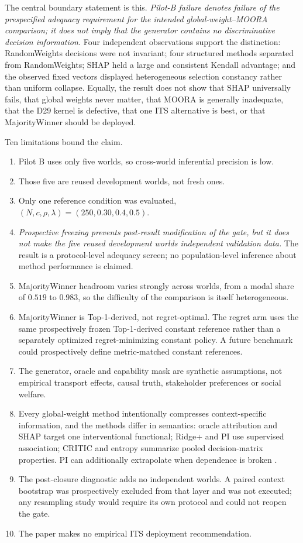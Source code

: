 \documentclass[runningheads,orivec]{llncs}
\newcommand{\MOORA}{MOORA}
\newcommand{\CRITIC}{CRITIC}
\begin{document}
The central boundary statement is this. \emph{Pilot-B failure denotes failure of the
prespecified adequacy requirement for the intended global-weight--\MOORA{} comparison;
it does not imply that the generator contains no discriminative decision information.}
Four independent observations support the distinction: RandomWeights decisions were not
invariant; four structured methods separated from RandomWeights; SHAP held a large and
consistent Kendall advantage; and the observed fixed vectors displayed heterogeneous
selection constancy rather than uniform collapse. Equally, the result does not show
that SHAP universally fails, that global weights never matter, that \MOORA{} is
generally inadequate, that the D29 kernel is defective, that one ITS alternative is
best, or that MajorityWinner should be deployed.

Ten limitations bound the claim.

\begin{enumerate}
\itemsep1pt
\item Pilot B uses only five worlds, so cross-world inferential precision is low.
\item Those five are reused development worlds, not fresh ones.
\item Only one reference condition was evaluated, $(N,c,\rho,\lambda)=(250,0.30,0.4,0.5)$.
\item \emph{Prospective freezing prevents post-result modification of the gate, but it
does not make the five reused development worlds independent validation data.} The
result is a protocol-level adequacy screen; no population-level inference about method
performance is claimed.
\item MajorityWinner headroom varies strongly across worlds, from a modal share of
$0.519$ to $0.983$, so the difficulty of the comparison is itself heterogeneous.
\item MajorityWinner is Top-1-derived, not regret-optimal. The regret arm uses the same
prospectively frozen Top-1-derived constant reference rather than a separately
optimized regret-minimizing constant policy. A future benchmark could prospectively
define metric-matched constant references.
\item The generator, oracle and capability mask are synthetic assumptions, not
empirical transport effects, causal truth, stakeholder preferences or social welfare.
\item Every global-weight method intentionally compresses context-specific information,
and the methods differ in semantics: oracle attribution and SHAP target one
interventional functional; Ridge+ and PI use supervised association; \CRITIC{} and
entropy summarize pooled decision-matrix properties. PI can additionally extrapolate
when dependence is broken \cite{hooker2021permutation}.
\item The post-closure diagnostic adds no independent worlds. A paired context
bootstrap was prospectively excluded from that layer and was not executed; any
resampling study would require its own protocol and could not reopen the gate.
\item The paper makes no empirical ITS deployment recommendation.
\end{enumerate}
\end{document}
